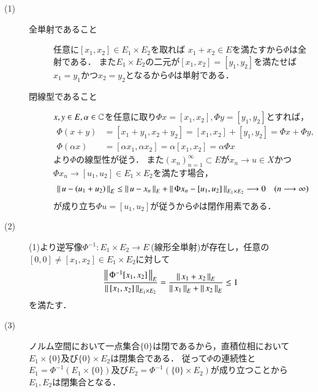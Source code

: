 	\begin{prf}\mbox{}
		\begin{description}
			\item[(1)] 
				\begin{description}
					\item[全単射であること]
						任意に$[x_1,x_2] \in E_1 \times E_2$を取れば
						$x_1 + x_2 \in E$を満たすから$\Phi$は全射である．
						また$E_1 \times E_2$の二元が$[x_1,x_2] = [y_1,y_2]$を満たせば
						$x_1 = y_1$かつ$x_2 = y_2$となるから$\Phi$は単射である．
						
					\item[閉線型であること]
						$x,y \in E,\alpha \in \mathbb{C}$を任意に取り$\Phi x = [x_1,x_2], \Phi y = [y_1,y_2]$とすれば，
						\begin{align}
							\Phi(x + y) &= [x_1 + y_1, x_2 + y_2] = [x_1,x_2] + [y_1,y_2] = \Phi x + \Phi y, \\
							\Phi(\alpha x) &= [\alpha x_1, \alpha x_2] = \alpha [x_1,x_2] = \alpha \Phi x
						\end{align}
						より$\Phi$の線型性が従う．
						また$(x_n)_{n=1}^{\infty} \subset E$が$x_n \rightarrow u \in X$かつ
						$\Phi x_n \rightarrow [u_1,u_2] \in E_1 \times E_2$を満たす場合，
						\begin{align}
							\left\|\, u - (u_1 + u_2)\, \right\|_{E} \leq \left\|\, u - x_n\, \right\|_{E} + \left\|\, \Phi x_n - [u_1,u_2]\, \right\|_{E_1 \times E_2}
							\longrightarrow 0 \quad (n \longrightarrow \infty)
						\end{align}
						が成り立ち$\Phi u = [u_1,u_2]$が従うから$\Phi$は閉作用素である．
				\end{description}
				
			\item[(2)] (1)より逆写像$\Phi^{-1}:E_1 \times E_2 \rightarrow E\ $(線形全単射)が存在し，任意の$[0,0] \neq [x_1,x_2] \in E_1 \times E_2$に対して
				\begin{align}
					\frac{\left\|\, \Phi^{-1}[x_1, x_2]\, \right\|_{E}}{\left\|\, [x_1, x_2]\, \right\|_{E_1 \times E_2}} 
					= \frac{\left\|\, x_1 + x_2\, \right\|_{E}}{\left\|\, x_1\, \right\|_{E} + \left\|\, x_2\, \right\|_{E}} \leq 1
				\end{align}
				を満たす．
				
			\item[(3)] ノルム空間において一点集合$\{0\}$は閉であるから，直積位相において$E_1 \times \{0\}$及び$\{0\} \times E_2$は閉集合である．
				従って$\Phi$の連続性と$E_1 = \Phi^{-1}(E_1 \times \{0\})$及び$E_2 = \Phi^{-1}(\{0\} \times E_2)$が成り立つことから
				$E_1,E_2$は閉集合となる．
			

\end{description}
\end{prf}
